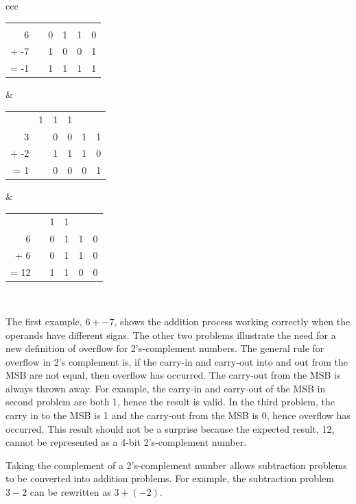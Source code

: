 {\small
\begin{tabular}{ccc}
\begin{tabular}{r|rrrrr}
     &   &   &   &   &     \\
   6 &   & 0 & 1 & 1 & 0   \\
+ -7 &   & 1 & 0 & 0 & 1   \\ \hline
= -1 &   & 1 & 1 & 1 & 1   \\
\end{tabular}
&
\begin{tabular}{r|rrrrr}
     & 1 & 1 & 1 &   &     \\
   3 &   & 0 & 0 & 1 & 1   \\
+ -2 &   & 1 & 1 & 1 & 0   \\ \hline
=  1 &   & 0 & 0 & 0 & 1   \\
\end{tabular}
&
\begin{tabular}{r|rrrrr}
     &   & 1 & 1 &   &     \\
   6 &   & 0 & 1 & 1 & 0   \\
+  6 &   & 0 & 1 & 1 & 0   \\ \hline
= 12 &   & 1 & 1 & 0 & 0   \\
\end{tabular} \\
\end{tabular}
}

The first example, 
$6 + -7$, shows  the addition process working correctly when
the operands have different signs.  The other two problems 
illustrate the need for a new definition of overflow for 2's-complement 
numbers.  The general rule for overflow in 2's complement 
is, \label{page:Ovf} if the carry-in and carry-out 
into and out from the MSB are not equal, then overflow has 
occurred.  The carry-out from the MSB is always thrown away.
For example, the carry-in and carry-out of the MSB in second
problem are both 1, hence the result is valid.  In the third
problem, the carry in to the MSB is 1 and the carry-out from the
MSB is 0, hence overflow has occurred.  This result should not be a 
surprise because the expected result, 12, cannot be represented
as a 4-bit 2's-complement number.

Taking the complement of a 2's-complement number allows subtraction
problems to be converted into addition problems.  \label{page:2sub}
For example, the subtraction problem $3 - 2$ can be rewritten as 
$3 + (-2)$.

